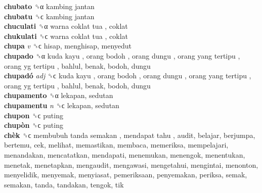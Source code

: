 \textbf{chubato} ␝α   kambing jantan   \\
\textbf{chubatu} ␝ϲ   kambing jantan   \\
\textbf{chuculati} ␝α   warna coklat tua , coklat  \\
\textbf{chukulati} ␝ϲ   warna coklat tua , coklat  \\
\textbf{chupa} \emph{v}  ␝ϲ  hisap, menghisap, menyedut  \\
\textbf{chupado} ␝α   kuda kayu ,  orang bodoh ,  orang dungu ,  orang yang tertipu ,  orang yg tertipu , bahlul, benak, bodoh, dungu  \\
\textbf{chupadó} \emph{adj}  ␝ϲ   kuda kayu ,  orang bodoh ,  orang dungu ,  orang yang tertipu ,  orang yg tertipu , bahlul, benak, bodoh, dungu  \\
\textbf{chupamento} ␝α  lekapan, sedutan  \\
\textbf{chupamentu} \emph{n}  ␝ϲ  lekapan, sedutan  \\
\textbf{chupon} ␝ϲ  puting  \\
\textbf{chupòn} ␝ϲ  puting  \\
\textbf{chèk} ␝ϲ   membubuh tanda semakan ,  mendapat tahu , audit, belajar, berjumpa, bertemu, cek, melihat, memastikan, membaca, memeriksa, mempelajari, menandakan, mencatatkan, mendapati, menemukan, menengok, menentukan, menetak, menetapkan, mengaudit, mengawasi, mengetahui, mengintai, menonton, menyelidik, menyemak, menyiasat, pemeriksaan, penyemakan, periksa, semak, semakan, tanda, tandakan, tengok, tik  \\

